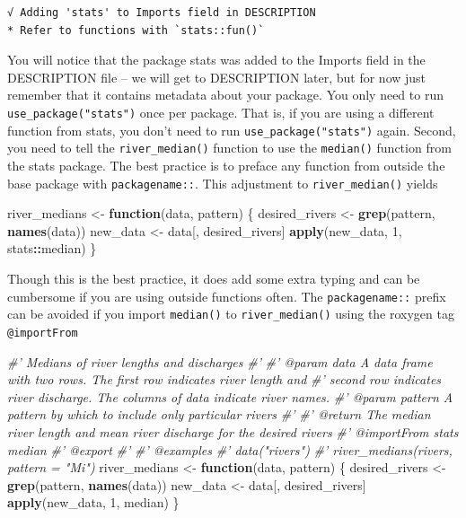 \documentclass[
]{book}
\newenvironment{Shaded}{\begin{snugshade}}{\end{snugshade}}
\newcommand{\CommentTok}[1]{\textcolor[rgb]{0.56,0.35,0.01}{\textit{#1}}}
\newcommand{\ControlFlowTok}[1]{\textcolor[rgb]{0.13,0.29,0.53}{\textbf{#1}}}
\newcommand{\DecValTok}[1]{\textcolor[rgb]{0.00,0.00,0.81}{#1}}
\newcommand{\KeywordTok}[1]{\textcolor[rgb]{0.13,0.29,0.53}{\textbf{#1}}}
\newcommand{\NormalTok}[1]{#1}
\newcommand{\OperatorTok}[1]{\textcolor[rgb]{0.81,0.36,0.00}{\textbf{#1}}}
\newcommand{\StringTok}[1]{\textcolor[rgb]{0.31,0.60,0.02}{#1}}
\begin{document}
\begin{verbatim}
√ Adding 'stats' to Imports field in DESCRIPTION
* Refer to functions with `stats::fun()`
\end{verbatim}

You will notice that the package stats was added to the Imports field in the DESCRIPTION file -- we will get to DESCRIPTION later, but for now just remember that it contains metadata about your package. You only need to run \texttt{use\_package("stats")} once per package. That is, if you are using a different function from stats, you don't need to run \texttt{use\_package("stats")} again. Second, you need to tell the \texttt{river\_median()} function to use the \texttt{median()} function from the stats package. The best practice is to preface any function from outside the base package with \texttt{packagename::}. This adjustment to \texttt{river\_median()} yields

\begin{Shaded}
\begin{Highlighting}[]
\NormalTok{river_medians <-}\StringTok{ }\ControlFlowTok{function}\NormalTok{(data, pattern) \{}
\NormalTok{  desired_rivers <-}\StringTok{ }\KeywordTok{grep}\NormalTok{(pattern, }\KeywordTok{names}\NormalTok{(data))}
\NormalTok{  new_data <-}\StringTok{ }\NormalTok{data[, desired_rivers]}
  \KeywordTok{apply}\NormalTok{(new_data, }\DecValTok{1}\NormalTok{, stats}\OperatorTok{::}\NormalTok{median)}
\NormalTok{\}}
\end{Highlighting}
\end{Shaded}

Though this is the best practice, it does add some extra typing and can be cumbersome if you are using outside functions often. The \texttt{packagename::} prefix can be avoided if you import \texttt{median()} to \texttt{river\_median()} using the roxygen tag \texttt{@importFrom}

\begin{Shaded}
\begin{Highlighting}[]
\CommentTok{#' Medians of river lengths and discharges}
\CommentTok{#'}
\CommentTok{#' @param data A data frame with two rows. The first row indicates river length and}
\CommentTok{#'   second row indicates river discharge. The columns of data indicate river names.}
\CommentTok{#' @param pattern A pattern by which to include only particular rivers}
\CommentTok{#'}
\CommentTok{#' @return The median river length and mean river discharge for the desired rivers}
\CommentTok{#' @importFrom stats median}
\CommentTok{#' @export}
\CommentTok{#'}
\CommentTok{#' @examples}
\CommentTok{#' data("rivers")}
\CommentTok{#' river_medians(rivers, pattern = "Mi")}
\NormalTok{river_medians <-}\StringTok{ }\ControlFlowTok{function}\NormalTok{(data, pattern) \{}
\NormalTok{  desired_rivers <-}\StringTok{ }\KeywordTok{grep}\NormalTok{(pattern, }\KeywordTok{names}\NormalTok{(data))}
\NormalTok{  new_data <-}\StringTok{ }\NormalTok{data[, desired_rivers]}
  \KeywordTok{apply}\NormalTok{(new_data, }\DecValTok{1}\NormalTok{, median)}
\NormalTok{\}}
\end{Highlighting}
\end{Shaded}
\end{document}
